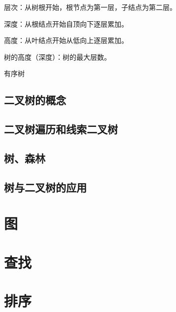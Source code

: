 \documentclass{ctexart}
\begin{document}
层次：从树根开始，根节点为第一层，子结点为第二层。

深度：从根结点开始自顶向下逐层累加。

高度：从叶结点开始从低向上逐层累加。

树的高度（深度）：树的最大层数。

有序树

\subsection{二叉树的概念}

\subsection{二叉树遍历和线索二叉树}

\subsection{树、森林}

\subsection{树与二叉树的应用}

\section{图}

\section{查找}

\section{排序}

\subsection{}
\end{document}
